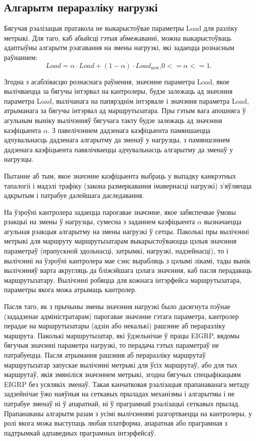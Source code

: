\subsection{Алгарытм пераразліку нагрузкі}

Бягучая рэалізацыя пратакола не выкарыстоўвае параметры Load для разліку метрыкі. Для таго, каб абыйсці гэтыя абмежаванні, можна выкарыстоўваць
адаптыўны алгарытм рэагавання на змены нагрузкі, які задаецца рознасным раўнаннем:
\begin{equation}
    Load = \alpha \cdot Load + (1 - \alpha) \cdot Load_\text{new}\text{,} 0 <= \alpha <= 1.
\end{equation}

Згодна з асаблівасцю рознаснага раўнення, значэнне параметра Load,
якое вылічваецца за бягучы інтэрвал на кантролеры, будзе залежаць ад значэння
параметра Load, вылічанага на папярэднім інтэрвале і значэння параметра Load, атрыманага за бягучы інтэрвал ад маршрутызатара. Пры гэтым вага
апошняга ў агульным выніку вылічэнняў бягучага такту будзе залежаць ад
значэння каэфіцыента $\alpha$. З павелічэннем дадзенага каэфіцыента памяншаецца адчувальнасць дадзенага алгарытму да зменаў у нагрузцы, з памяншэннем дадзенага каэфіцыента павялічваецца адчувальнасць алгарытму
да зменаў у нагрузцы.

Пытанне аб тым, якое значэнне каэфіцыента выбраць
у выпадку канкрэтных тапалогіі і мадэлі трафіку (закона размеркавання імавернасці нагрузкі) з'яўляецца адкрытым і патрабуе далейшага даследавання.

На ўзроўні кантролера задаецца парогавае значэнне, якое забяспечвае ўмовы рэакцыі на змены ў нагрузцы, сумесна з заданнем каэфіцыента $\alpha$ вызначаецца агульная рэакцыя алгарытму на змены нагрузкі ў сетцы.
Паколькі пры вылічэнні метрыкі для маршруту маршрутызатарам выкарыстоўваюцца цэлыя значэння параметраў (прапускной здольнасці, затрымкі,
нагрузкі, надзейнасці), то і вылічэнні на ўзроўні кантролера мае сэнс
вырабляць з цэлымі лікамі, тады вынік вылічэнняў варта акругляць
да бліжэйшага цэлага значэння, каб пасля перадаваць маршрутызатару.
Вылічэнні робяцца для кожнага інтэрфейса маршрутызатара, параметры якога можа атрымаць кантролер.

Пасля таго, як з прычыны змены значэння нагрузкі было дасягнута пэўнае (зададзенае адміністратарам) парогавае значэнне гэтага параметра, кантролер перадае на маршрутызатары (адзін або некалькі) рашэнне
аб пераразліку маршрута. Паколькі маршрутызатар, які ўдзельнічае ў працы
EIGRP, вядомы бягучыя значэнні параметра нагрузкі, то перадача гэтых параметраў не патрабуецца. Пасля атрымання рашэння аб пераразліку маршрутаў
маршрутызатар запускае вылічэнні метрыкі для ўсіх маршрутаў, або для тых
маршрутаў, якія змяніліся значэннем метрыкі, згодна
бягучых спецыфікацыям EIGRP без усялякіх зменаў. Такая канчатковая рэалізацыя прапанаванага метаду задзейнічае ўжо наяўныя на сеткавых прыладах механізмы і алгарытмы і не патрабуе зменаў ні ў апаратнай, ні
ў праграмнай рэалізацыі сеткавых прылад. Прапанаваны алгарытм разам
з усімі вылічэннямі разгортваецца на кантролеры, у ролі якога можа
выступаць любая платформа, апаратная або праграмная з падтрымкай адпаведных праграмных інтэрфейсаў.

